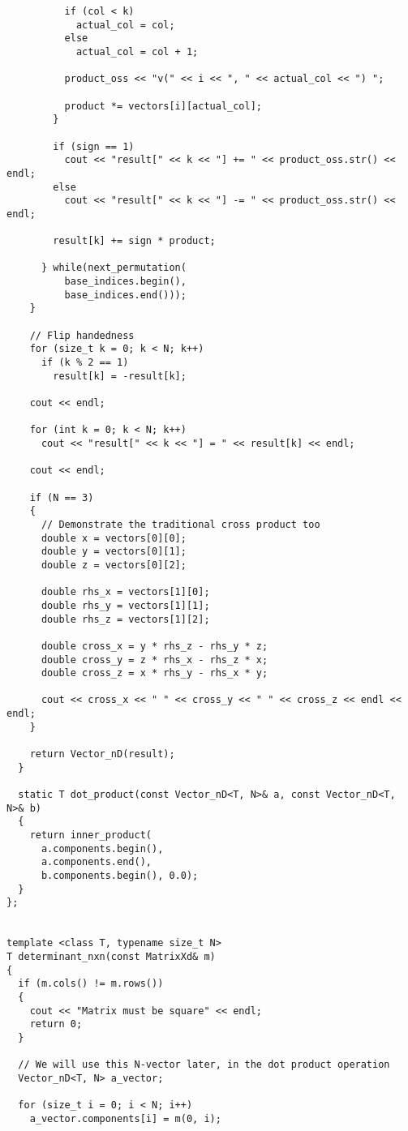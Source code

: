 \documentclass[12pt]{article}
\begin{document}
\begin{lstlisting}
          if (col < k)
            actual_col = col;
          else
            actual_col = col + 1;

          product_oss << "v(" << i << ", " << actual_col << ") ";

          product *= vectors[i][actual_col];
        }

        if (sign == 1)
          cout << "result[" << k << "] += " << product_oss.str() << endl;
        else
          cout << "result[" << k << "] -= " << product_oss.str() << endl;

        result[k] += sign * product;

      } while(next_permutation(
          base_indices.begin(), 
          base_indices.end()));
    }

    // Flip handedness
    for (size_t k = 0; k < N; k++)
      if (k % 2 == 1)
        result[k] = -result[k];

    cout << endl;

    for (int k = 0; k < N; k++)
      cout << "result[" << k << "] = " << result[k] << endl;

    cout << endl;

    if (N == 3)
    {
      // Demonstrate the traditional cross product too
      double x = vectors[0][0];
      double y = vectors[0][1];
      double z = vectors[0][2];

      double rhs_x = vectors[1][0];
      double rhs_y = vectors[1][1];
      double rhs_z = vectors[1][2];

      double cross_x = y * rhs_z - rhs_y * z;
      double cross_y = z * rhs_x - rhs_z * x;
      double cross_z = x * rhs_y - rhs_x * y;

      cout << cross_x << " " << cross_y << " " << cross_z << endl << endl;
    }

    return Vector_nD(result);
  }

  static T dot_product(const Vector_nD<T, N>& a, const Vector_nD<T, N>& b)
  {
    return inner_product(
      a.components.begin(), 
      a.components.end(), 
      b.components.begin(), 0.0);
  }
};


template <class T, typename size_t N>
T determinant_nxn(const MatrixXd& m)
{
  if (m.cols() != m.rows())
  {
    cout << "Matrix must be square" << endl;
    return 0;
  }

  // We will use this N-vector later, in the dot product operation
  Vector_nD<T, N> a_vector;

  for (size_t i = 0; i < N; i++)
    a_vector.components[i] = m(0, i);


\end{lstlisting}
\end{document}
